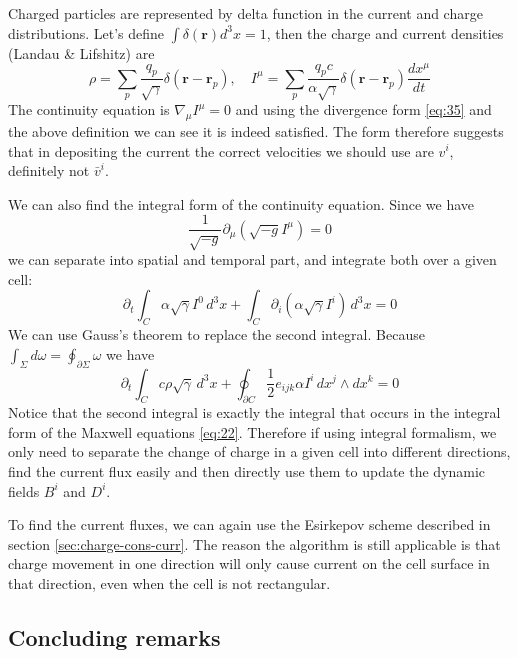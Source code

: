 Charged particles are represented by delta function in the current and charge
distributions. Let's define $\int \delta(\mathbf{r})d^3x = 1$, then the charge
and current densities (Landau \& Lifshitz) are
\begin{equation}
  \label{eq:34}
  \rho = \sum_p\frac{q_p}{\sqrt{\gamma}}\delta(\mathbf{r}-\mathbf{r}_p),\quad I^{\mu} = \sum_p\frac{q_pc}{\alpha\sqrt{\gamma}}\delta(\mathbf{r} - \mathbf{r}_p)\frac{dx^{\mu}}{dt}
\end{equation}
The continuity equation is $\nabla_{\mu}I^{\mu} = 0$ and using the divergence
form \eqref{eq:35} and the above definition we can see it is indeed satisfied.
The form therefore suggests that in depositing the current the correct
velocities we should use are $v^i$, definitely not $\bar{v}^i$.

We can also find the integral form of the continuity equation. Since we have
\begin{equation}
  \label{eq:35}
  \frac{1}{\sqrt{-g}}\partial_{\mu}\left( \sqrt{-g} I^{\mu} \right) = 0
\end{equation}
we can separate into spatial and temporal part, and integrate both over a given
cell:
\begin{equation}
  \label{eq:36}
  \partial_t\int_C \alpha\sqrt{\gamma}I^0\,d^3x + \int_C \partial_i \left( \alpha\sqrt{\gamma}I^i \right)\,d^3x = 0
\end{equation}
We can use Gauss's theorem to replace the second integral. Because $\int_{\Sigma} d\omega
= \oint_{\partial\Sigma}\omega$ we have
\begin{equation}
  \label{eq:37}
  \partial_t\int_Cc\rho\sqrt{\gamma}\,d^3x + \oint_{\partial C}\frac{1}{2}e_{ijk}\alpha I^i\,dx^j\wedge dx^k = 0
\end{equation}
Notice that the second integral is exactly the integral that occurs in the
integral form of the Maxwell equations \eqref{eq:22}. Therefore if using
integral formalism, we only need to separate the change of charge in a given
cell into different directions, find the current flux easily and then directly
use them to update the dynamic fields $B^i$ and $D^i$.

To find the current fluxes, we can again use the Esirkepov scheme described in
section \ref{sec:charge-cons-curr}. The reason the algorithm is still applicable
is that charge movement in one direction will only cause current on the cell
surface in that direction, even when the cell is not rectangular.

\subsection{Concluding remarks}
\label{sec:gr-conclusion}

